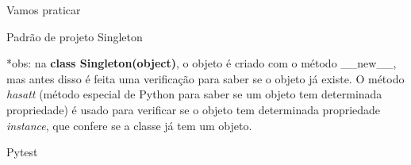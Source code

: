 \begin{frame}[t]{Vamos praticar}
	\vspace{1em}
	\centering
\end{frame}


\begin{frame}[t]{Padrão de projeto Singleton}

	

	*obs: na \textbf{class Singleton(object)}, o objeto é criado com o método \_\_new\_\_, mas antes disso é feita uma verificação para saber se o objeto já existe. O método \textit{hasatt} (método especial de Python para saber se um objeto tem determinada propriedade) é usado para verificar se o objeto tem determinada propriedade \textit{instance}, que confere se a classe já tem um objeto.

\end{frame}



\begin{frame}[t]{Pytest}
	
	\vspace{-0.5em}
	
	
\end{frame}



